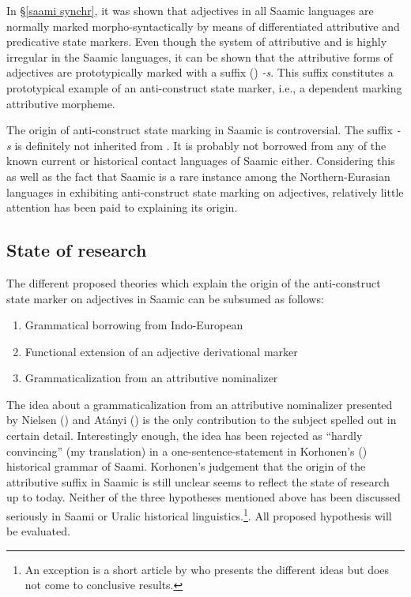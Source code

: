 {In \S\ref{saami synchr}, it was shown that adjectives in all Saamic languages are normally marked morpho-syntactically by means of differentiated attributive and predicative state markers. Even though the system of attributive and  is highly irregular in the Saamic languages, it can be shown that the attributive forms of adjectives are prototypically marked with a suffix () \textit{-s}. This suffix constitutes a prototypical example of an anti\hyp{}construct state marker, i.e., a dependent marking attributive morpheme.

The origin of anti\hyp{}construct state marking in Saamic is controversial. The suffix \textit{-s} is definitely not inherited from . It is probably not borrowed from any of the known current or historical contact languages of Saamic either. Considering this as well as the fact that Saamic is a rare instance among the Northern-Eurasian languages in exhibiting anti\hyp{}construct state marking on adjectives, relatively little attention has been paid to explaining its origin.

\subsection{State of research}
The different proposed theories which explain the origin of the anti\hyp{}construct state marker on adjectives in Saamic can be subsumed as follows:
\begin{enumerate}
\item Grammatical borrowing from Indo-European
\item Functional extension of an adjective derivational marker
\item Grammaticalization from an attributive nominalizer
\end{enumerate}
The idea about a grammaticalization from an attributive nominalizer presented by Nielsen (\citeyear{nielsen1933}) and Atányi (\citeyear{atanyi1942,atanyi1943}) is the only contribution to the subject spelled out in certain detail. Interestingly enough, the idea has been rejected as “hardly convincing” (my translation) in a one-sentence-statement in Korhonen's (\citeyear{korhonen-m1981}) historical grammar of Saami. Korhonen's judgement that the origin of the attributive suffix in Saamic is still unclear \cite[246]{korhonen-m1981} seems to reflect the state of research up to today. Neither of the three hypotheses mentioned above has been discussed seriously in Saami or Uralic historical linguistics.\footnote{An exception is a short article by \cite{sarv-m2001} who presents the different ideas but does not come to conclusive results.}. All proposed hypothesis will be evaluated.

}
